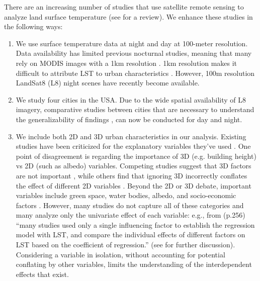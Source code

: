 \documentclass[final,3p,times,onecolumn,sort&compress]{elsarticle}
\begin{document}
There are an increasing number of studies that use satellite remote sensing to analyze land surface temperature (see \cite{Zhou2018-iy} for a review).
We enhance these studies in the following ways:
\begin{enumerate}
    \item We use surface temperature data at night and day at 100-meter resolution.
    Data availability has limited previous nocturnal studies, meaning that many rely on MODIS images with a 1km resolution \citep{Zhou2014-wc, Echevarria_Icaza2016-fr,Wang2019-tree,Peng2012-iy}.
    1km resolution makes it difficult to attribute LST to urban characteristics \citep{Chun2017-mm, Echevarria_Icaza2016-fr, Wicki2017-fv, Zhou2014-wc}. 
    However, 100m resolution LandSat8 (L8) night scenes have recently become available. 
    
    \item We study four cities in the USA.
    Due to the wide spatial availability of L8 imagery, comparative studies between cities that are necessary to understand the generalizability of findings \citep{Peng2012-iy, Hung2006-qy}, can now be conducted for day and night.
    
    \item We include both 2D and 3D urban characteristics in our analysis.
    Existing studies have been criticized for the explanatory variables they've used \citep{Chun2017-mm,Peng2018-cp}.
    One point of disagreement is regarding the importance of 3D (e.g. building height) vs 2D (such as albedo) variables.
    Competing studies suggest that 3D factors are not important \citep{Berger2017-lx}, while others find that ignoring 3D incorrectly conflates the effect of different 2D variables \citep{Chun2017-mm}.
    Beyond the 2D or 3D debate, important variables include green space, water bodies, albedo, and socio-economic factors \citep{Peng2018-cp}. 
    However, many studies do not capture all of these categories and many analyze only the univariate effect of each variable: e.g., from \cite{Peng2018-cp} (p.256) ``many studies used only a single influencing factor to establish the regression model with LST, and compare the individual effects of different factors on LST based on the coefficient of regression.'' (see \cite{Peng2018-cp, Chun2017-mm} for further discussion). 
    Considering a variable in isolation, without accounting for potential conflating by other variables, limits the understanding of the interdependent effects that exist.
    

\end{enumerate}
\end{document}
